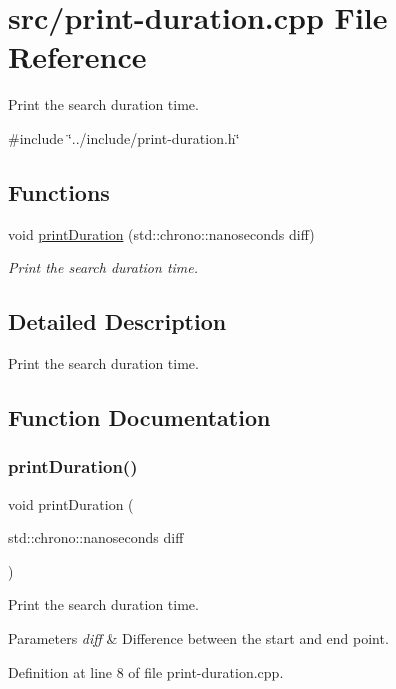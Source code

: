 \hypertarget{print-duration_8cpp}{}\section{src/print-\/duration.cpp File Reference}
\label{print-duration_8cpp}


Print the search duration time.  


{\ttfamily \#include \char`\"{}../include/print-\/duration.\+h\char`\"{}}\newline
\subsection*{Functions}
\begin{DoxyCompactItemize}
\item 
void \mbox{\hyperlink{print-duration_8cpp_a4c1e331c0cba77ad1ab6588631c69dd4}{print\+Duration}} (std\+::chrono\+::nanoseconds diff)
\begin{DoxyCompactList}\small\item\em Print the search duration time. \end{DoxyCompactList}\end{DoxyCompactItemize}


\subsection{Detailed Description}
Print the search duration time. 



\subsection{Function Documentation}
\mbox{\label{print-duration_8cpp_a4c1e331c0cba77ad1ab6588631c69dd4}} 
\subsubsection{\texorpdfstring{printDuration()}{printDuration()}}
{\footnotesize\ttfamily void print\+Duration (\begin{DoxyParamCaption}\item[{std\+::chrono\+::nanoseconds}]{diff }\end{DoxyParamCaption})}



Print the search duration time. 


\begin{DoxyParams}{Parameters}
{\em diff} & Difference between the start and end point. \\
\hline
\end{DoxyParams}


Definition at line 8 of file print-\/duration.\+cpp.

